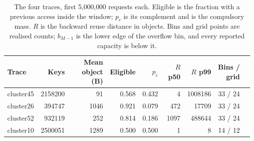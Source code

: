 \begin{table}[h]
\centering
\footnotesize
{}
\caption{The four traces, first 5{,}000{,}000 requests each. Eligible is the
fraction with a previous access inside the window; $p_c$ is its complement and is
the compulsory mass. $R$ is the backward reuse distance in objects. Bins and grid
points are realised counts; $b_{M-1}$ is the lower edge of the overflow bin, and
every reported capacity is below it.}
\label{tab:traces}
\begin{tabular}{@{}l r r r r r r r r@{}}
\toprule
Trace & {Keys} & {Mean object (B)} & {Eligible} & {$p_c$} & {$R$ p50} & {$R$ p99} & {Bins / grid} \\
\midrule
cluster45 & \num{2158200} & \num{91} & 0.568 & 0.432 & \num{4} & \num{1008186} & 33 / 24 \\
cluster26 & \num{394747} & \num{1046} & 0.921 & 0.079 & \num{472} & \num{17709} & 33 / 24 \\
cluster52 & \num{932119} & \num{252} & 0.814 & 0.186 & \num{1097} & \num{488644} & 33 / 24 \\
cluster10 & \num{2500051} & \num{1289} & 0.500 & 0.500 & \num{1} & \num{8} & 14 / 12 \\
\bottomrule
\end{tabular}
\end{table}
